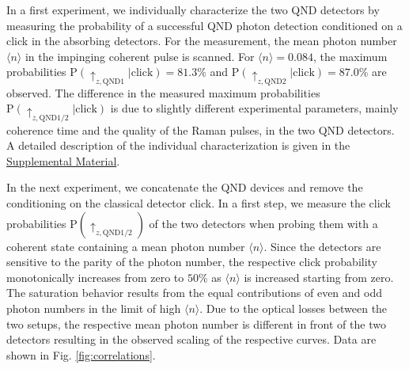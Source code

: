 \documentclass[prl,twocolumn,amsmath,amssymb,bibnotes,aps,longbibliography]{revtex4-1}
\newcommand{\braket}[1]{\langle{#1}\rangle}
\begin{document}
In a first experiment, we individually characterize the two QND detectors by measuring the probability of a successful QND photon detection conditioned on a click in the absorbing detectors. For the measurement, the mean photon number $\braket{n}$ in the impinging coherent pulse is scanned. For $\braket{n}=0.084$, the maximum probabilities $\text{P}(\uparrow_{z, \text{QND1}}\vert\text{click})=81.3\%$ and $\text{P}(\uparrow_{z, \text{QND2}}\vert\text{click})=87.0\%$ are observed. The difference in the measured maximum probabilities $\text{P}(\uparrow_{z, \text{QND1/2}}\vert\text{click})$ is due to slightly different experimental parameters, mainly coherence time and the quality of the Raman pulses, in the two QND detectors. A detailed description of the individual characterization is given in the \hyperref[supplement]{Supplemental Material}.

In the next experiment, we concatenate the QND devices and remove the conditioning on the classical detector click. In a first step, we measure the click probabilities $\text{P}(\uparrow_{z,\text{QND1/2}})$ of the two detectors when probing them with a coherent state containing a mean photon number $\braket{n}$. Since the detectors are sensitive to the parity of the photon number, the respective click probability monotonically increases from zero to $50\%$ as $\braket{n}$ is increased starting from zero. The saturation behavior results from the equal contributions of even and odd photon numbers in the limit of high $\braket{n}$. Due to the optical losses between the two setups, the respective mean photon number is different in front of the two detectors resulting in the observed scaling of the respective curves. Data are shown in Fig. \ref{fig:correlations}.
\end{document}
